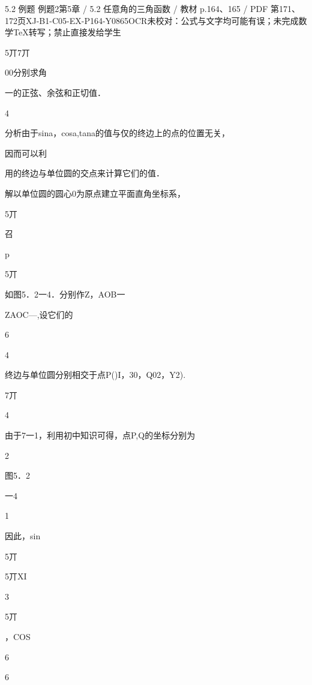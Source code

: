 \begin{bankitem}{5.2 例题 例题2}{第5章 / 5.2 任意角的三角函数 / 教材 p.164、165 / PDF 第171、172页}{XJ-B1-C05-EX-P164-Y0865}{OCR未校对：公式与文字均可能有误；未完成数学TeX转写；禁止直接发给学生}
\begin{ocrdraft}
\par
5丌7丌
\par
00分别求角
\par
一的正弦、余弦和正切值．
\par
4
\par
分析由于sina，cosa,tana的值与仅的终边上的点的位置无关，
\par
因而可以利
\par
用的终边与单位圆的交点来计算它们的值．
\par
解以单位圆的圆心0为原点建立平面直角坐标系，
\par
5丌
\par
召
\par
p
\par
5丌
\par
如图5．2一4．分别作Z，AOB一
\par
ZAOC—,设它们的
\par
6
\par
4
\par
终边与单位圆分别相交于点P()I，30，Q02，Y2).
\par
7丌
\par
4
\par
由于7一1，利用初中知识可得，点P,Q的坐标分别为
\par
2
\par
图5．2
\par
一4
\par
1
\par
因此，sin
\par
5丌
\par
5丌XI
\par
3
\par
5丌
\par
，COS
\par
6
\par
6
\par

\end{ocrdraft}
\end{bankitem}

